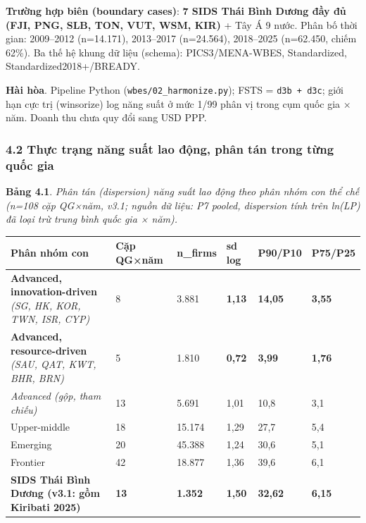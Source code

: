 \documentclass[12pt,a4paper]{article}
\begin{document}
\textbf{Trường hợp biên (boundary cases)}: \textbf{7 SIDS Thái Bình
Dương đầy đủ (FJI, PNG, SLB, TON, VUT, WSM, KIR)} + Tây Á 9 nước. Phân
bố thời gian: 2009--2012 (n=14.171), 2013--2017 (n=24.564), 2018--2025
(n=62.450, chiếm 62\%). Ba thế hệ khung dữ liệu (schema):
PICS3/MENA-WBES, Standardized, Standardized2018+/BREADY.

\textbf{Hài hòa}. Pipeline Python (\texttt{wbes/02\_harmonize.py}); FSTS
= \texttt{d3b\ +\ d3c}; giới hạn cực trị (winsorize) log năng suất ở mức
1/99 phân vị trong cụm quốc gia × năm. Doanh thu chưa quy đổi sang USD
PPP.

\hypertarget{42-thux1ef1c-trux1ea1ng-nux103ng-suux1ea5t-lao-ux111ux1ed9ng-phuxe2n-tuxe1n-trong-tux1eebng-quux1ed1c-gia}{%
\subsubsection{4.2 Thực trạng năng suất lao động, phân tán trong từng
quốc
gia}\label{42-thux1ef1c-trux1ea1ng-nux103ng-suux1ea5t-lao-ux111ux1ed9ng-phuxe2n-tuxe1n-trong-tux1eebng-quux1ed1c-gia}}

\textbf{Bảng 4.1}. \emph{Phân tán (dispersion) năng suất lao động theo
phân nhóm con thể chế (n=108 cặp QG×năm, v3.1; nguồn dữ liệu: P7 pooled,
dispersion tính trên ln(LP) đã loại trừ trung bình quốc gia × năm).}

\begin{longtable}[]{@{}llllll@{}}
\toprule\noalign{}
Phân nhóm con & Cặp QG×năm & n\_firms & sd log & P90/P10 & P75/P25 \\
\midrule\noalign{}
\endhead
\bottomrule\noalign{}
\endlastfoot
\textbf{Advanced, innovation-driven} \emph{(SG, HK, KOR, TWN, ISR, CYP)}
& 8 & 3.881 & \textbf{1,13} & \textbf{14,05} & \textbf{3,55} \\
\textbf{Advanced, resource-driven} \emph{(SAU, QAT, KWT, BHR, BRN)} & 5
& 1.810 & \textbf{0,72} & \textbf{3,99} & \textbf{1,76} \\
\emph{Advanced (gộp, tham chiếu)} & 13 & 5.691 & 1,01 & 10,8 & 3,1 \\
Upper-middle & 18 & 15.174 & 1,29 & 27,7 & 5,4 \\
Emerging & 20 & 45.388 & 1,24 & 30,6 & 5,1 \\
Frontier & 42 & 18.877 & 1,36 & 39,6 & 6,1 \\
\textbf{SIDS Thái Bình Dương (v3.1: gồm Kiribati 2025)} & \textbf{13} &
\textbf{1.352} & \textbf{1,50} & \textbf{32,62} & \textbf{6,15} \\
\end{longtable}
\end{document}
